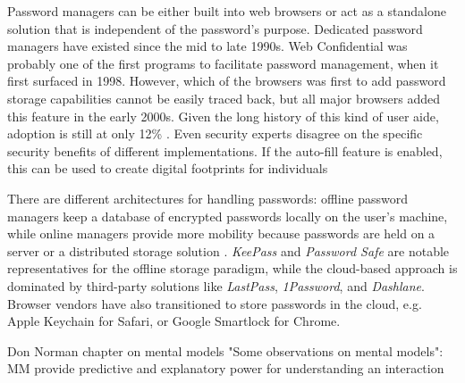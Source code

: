Password managers can be either built into web browsers or act as a standalone solution that is independent of the password's purpose. Dedicated password managers have existed since the mid to late 1990s. Web Confidential was probably one of the first programs to facilitate password management, when it first surfaced in 1998. However, which of the browsers was first to add password storage capabilities cannot be easily traced back, but all major browsers added this feature in the early 2000s. Given the long history of this kind of user aide, adoption is still at only 12\% \cite{Olmstead2017AmerciansCybersecurity}. Even security experts disagree on the specific security benefits of different implementations. If the auto-fill feature is enabled, this can be used to create digital footprints for individuals

There are different architectures for handling passwords: offline password managers keep a database of encrypted passwords locally on the user's machine, while online managers provide more mobility because passwords are held on a server or a distributed storage solution \cite{McCarney2012Tapas}. \textit{KeePass} and \textit{Password Safe} are notable representatives for the offline storage paradigm, while the cloud-based approach is dominated by third-party solutions like \textit{LastPass}, \textit{1Password}, and \textit{Dashlane}. Browser vendors have also transitioned to store passwords in the cloud, e.g. Apple Keychain for Safari, or Google Smartlock for Chrome. 





Don Norman chapter on mental models "Some observations on mental models": MM provide predictive and explanatory power for understanding an interaction \cite{Norman1982ObservationsMentalModels}

